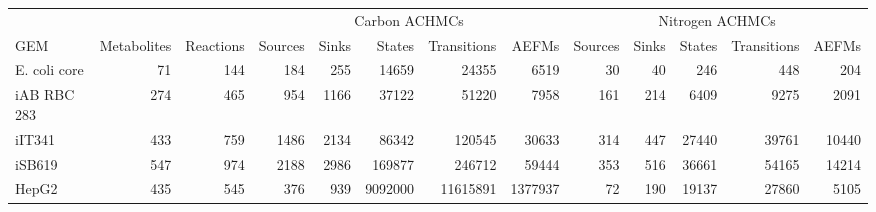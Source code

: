 \begin{tabular}{l rr rrrrr rrrrr}
	\toprule
	& & & \multicolumn{5}{c}{Carbon ACHMCs} & \multicolumn{5}{c}{Nitrogen ACHMCs}\\
	\cmidrule(lr){4-8} \cmidrule(lr){9-13}
	GEM & Metabolites & Reactions & Sources & Sinks & States & Transitions & AEFMs & Sources & Sinks & States & Transitions & AEFMs\\
	\midrule
	E. coli core & 71 & 144 & 184 & 255 & 14659 & 24355 & 6519 & 30 & 40 & 246 & 448 & 204\\
	iAB RBC 283 & 274 & 465 & 954 & 1166 & 37122 & 51220 & 7958 & 161 & 214 & 6409 & 9275 & 2091\\
	iIT341 & 433 & 759 & 1486 & 2134 & 86342 & 120545 & 30633 & 314 & 447 & 27440 & 39761 & 10440\\
	iSB619 & 547 & 974 & 2188 & 2986 & 169877 & 246712 & 59444 & 353 & 516 & 36661 & 54165 & 14214\\
	HepG2 & 435 & 545 & 376 & 939 & 9092000 & 11615891 & 1377937 & 72 & 190 & 19137 & 27860 & 5105\\
	\bottomrule
\end{tabular}
